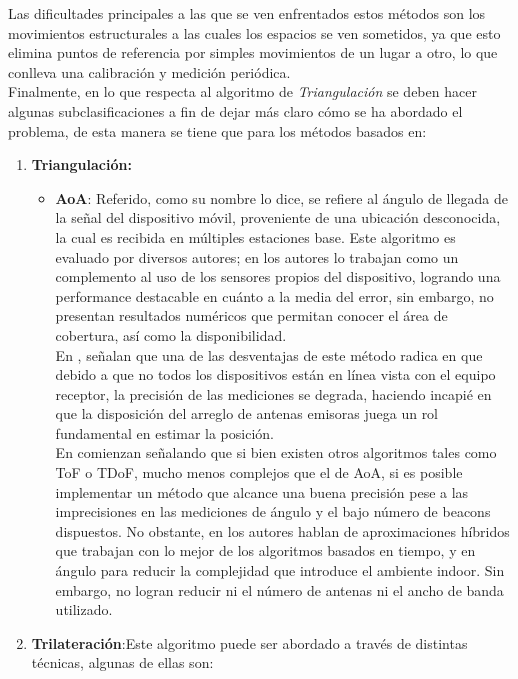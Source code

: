 Las dificultades principales a las que se ven enfrentados estos métodos son los movimientos estructurales a las cuales los espacios se ven sometidos, ya que esto elimina puntos de referencia por simples movimientos de un lugar a otro, lo que conlleva una calibración y medición periódica.\cite{20}\\

Finalmente, en lo que respecta al algoritmo de \textit{Triangulación} se deben hacer algunas subclasificaciones a fin de dejar más claro cómo se ha abordado el problema, de esta manera se tiene que para los métodos basados en:\\
\begin{enumerate}
\item{\textbf{Triangulación:}
    \begin{itemize}
        \item{\textbf{\ac{AoA}}: Referido, como su nombre lo dice, se refiere al ángulo de llegada de la señal del dispositivo móvil, proveniente de una ubicación desconocida, la cual es recibida en múltiples estaciones base. Este algoritmo es evaluado por diversos autores; en \cite{1} los autores lo trabajan como un complemento al uso de los sensores propios del dispositivo, logrando una performance destacable en cuánto a la media del error, sin embargo, no presentan resultados numéricos que permitan conocer el área de cobertura, así como la disponibilidad.\\
            
        En \cite{20}, señalan que una de las desventajas de este método radica en que debido a que no todos los dispositivos están en línea vista con el equipo receptor, la precisión de las mediciones se degrada, haciendo incapié en que la disposición del arreglo de antenas emisoras juega un rol fundamental en estimar la posición.\\
            
        En \cite{21} comienzan señalando que si bien existen otros algoritmos tales como ToF o TDoF, mucho menos complejos que el de AoA, si es posible implementar un método que alcance una buena precisión pese a las imprecisiones en las mediciones de ángulo y el bajo número de beacons dispuestos. No obstante, en \cite{5} los autores hablan de aproximaciones  híbridos que trabajan con lo mejor de los algoritmos basados en tiempo, y en ángulo para reducir la complejidad que introduce el ambiente indoor. Sin embargo, no logran reducir ni el número de antenas ni el ancho de banda utilizado.}
        \end{itemize}
        }
\item{\textbf{Trilateración}:Este algoritmo puede ser abordado a través de distintas técnicas, algunas de ellas son:
        
}
\end{enumerate}
